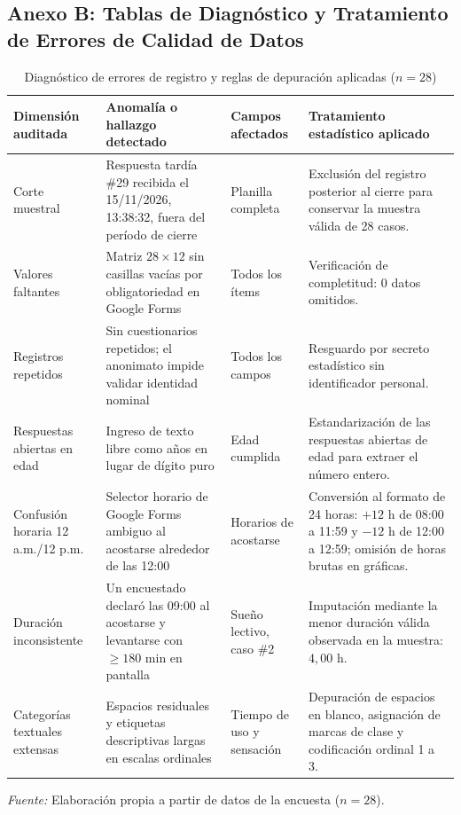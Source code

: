 \documentclass[12pt, letterpaper]{article}
\begin{document}
\subsection{Anexo B: Tablas de Diagnóstico y Tratamiento de Errores de Calidad de Datos}\label{subsec:anexob}

\renewcommand{\thetable}{A\arabic{table}}
\renewcommand{\theHtable}{A.\arabic{table}}
\setcounter{table}{0}

\begin{table}[H]
\centering
\caption{Diagnóstico de errores de registro y reglas de depuración aplicadas \mbox{($n = 28$)}}
\label{tab:a1}
\scriptsize
\begin{tabularx}{\textwidth}{>{\raggedright\arraybackslash}p{2.7cm}>{\raggedright\arraybackslash}p{4.3cm}>{\raggedright\arraybackslash}p{2.5cm}>{\raggedright\arraybackslash}X}
\toprule
\textbf{Dimensión auditada} & \textbf{Anomalía o hallazgo detectado} & \textbf{Campos afectados} & \textbf{Tratamiento estadístico aplicado} \\
\midrule
Corte muestral & Respuesta tardía \#29 recibida el 15/11/2026, 13:38:32, fuera del período de cierre & Planilla completa & Exclusión del registro posterior al cierre para conservar la muestra válida de 28 casos. \\
\addlinespace
Valores faltantes & Matriz $28 \times 12$ sin casillas vacías por obligatoriedad en Google Forms & Todos los ítems & Verificación de completitud: 0 datos omitidos. \\
\addlinespace
Registros repetidos & Sin cuestionarios repetidos; el anonimato impide validar identidad nominal & Todos los campos & Resguardo por secreto estadístico sin identificador personal. \\
\addlinespace
Respuestas abiertas en edad & Ingreso de texto libre como \guillemotleft 20 años\guillemotright{} en lugar de dígito puro & Edad cumplida & Estandarización de las respuestas abiertas de edad para extraer el número entero. \\
\addlinespace
Confusión horaria 12 a.m./12 p.m. & Selector horario de Google Forms ambiguo al acostarse alrededor de las 12:00 & Horarios de acostarse & Conversión al formato de 24 horas: $+12\text{ h}$ de 08:00 a 11:59 y $-12\text{ h}$ de 12:00 a 12:59; omisión de horas brutas en gráficas. \\
\addlinespace
Duración inconsistente & Un encuestado declaró las 09:00 al acostarse y levantarse con $\ge 180\text{ min}$ en pantalla & Sueño lectivo, caso \#2 & Imputación mediante la menor duración válida observada en la muestra: $4{,}00\text{ h}$. \\
\addlinespace
Categorías textuales extensas & Espacios residuales y etiquetas descriptivas largas en escalas ordinales & Tiempo de uso y sensación & Depuración de espacios en blanco, asignación de marcas de clase y codificación ordinal 1 a 3. \\
\bottomrule
\end{tabularx}
\par\smallskip\parbox{\textwidth}{\footnotesize\textit{Fuente:} Elaboración propia a partir de datos de la encuesta ($n = 28$).}
\end{table}
\end{document}
